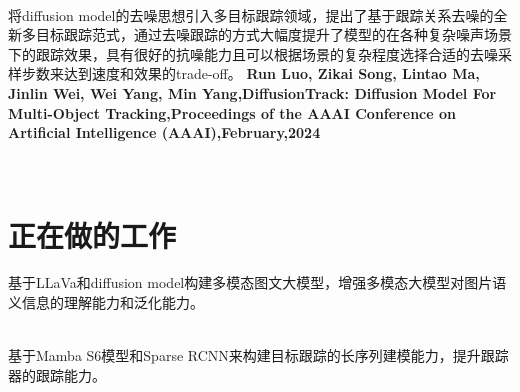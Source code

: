\documentclass{uniquecv}
\begin{document}
\\

将diffusion model的去噪思想引入多目标跟踪领域，提出了基于跟踪关系去噪的全新多目标跟踪范式，通过去噪跟踪的方式大幅度提升了模型的在各种复杂噪声场景下的跟踪效果，具有很好的抗噪能力且可以根据场景的复杂程度选择合适的去噪采样步数来达到速度和效果的trade-off。
\textbf{Run Luo, Zikai Song, Lintao Ma, Jinlin Wei, Wei Yang, Min Yang,DiffusionTrack: Diffusion Model For Multi-Object Tracking,Proceedings of the AAAI Conference on Artificial Intelligence (AAAI),February,2024}

\\

\section{正在做的工作}

基于LLaVa和diffusion model构建多模态图文大模型，增强多模态大模型对图片语义信息的理解能力和泛化能力。
\vspace{0.4ex}

\\

基于Mamba S6模型和Sparse RCNN来构建目标跟踪的长序列建模能力，提升跟踪器的跟踪能力。

\end{document}
